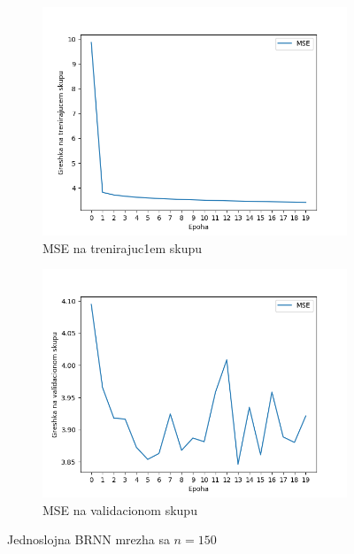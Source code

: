 \documentclass[a4paper, openany, oneside, 11pt]{book}
\begin{document}
\begin{figure}[!h]
        \centering
        \begin{subfigure}{0.475\textwidth}
            \centering
            \includegraphics[scale=0.45]{res/BidirectSingleLayerLSTM_150units_train.png}
            \caption{\acrshort{MSE} na trenirajuc1em skupu}
            \label{fig:4_10a}
            \vspace{0pt}
        \end{subfigure}%
        \begin{subfigure}{0.475\textwidth}
            \centering
            \includegraphics[scale=0.45]{res/BidirectSingleLayerLSTM_150units_validation.png}
            \caption{\acrshort{MSE} na validacionom skupu}
            \label{fig:4_10b}
            \vspace{0pt}
        \end{subfigure}
        \caption{Jednoslojna \acrshort{BRNN} mrezha sa $n=150$}
        \label{fig:4_10}
\end{figure}
\end{document}
